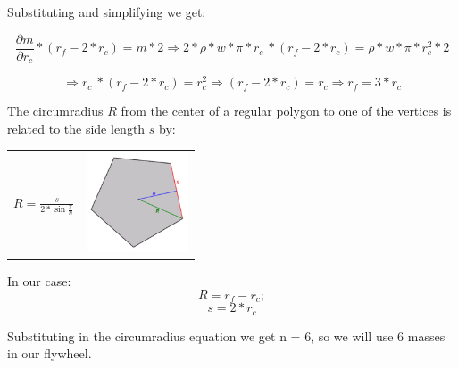 Substituting and simplifying we get:

\[\frac{\partial m}{\partial r_c} * (r_f - 2 * r_c) =  m * 2 \Rightarrow 2 * \rho * w * \pi *  r_c\ * (r_f - 2 * r_c) = \rho * w * \pi * r_c^2 * 2 \]

\[ \Rightarrow r_c\ * (r_f - 2 * r_c) =  r_c^2 \Rightarrow (r_f - 2 * r_c) =  r_c \Rightarrow r_f = 3 * r_c\]


The circumradius $R$ from the center of a regular polygon to one of the vertices is related to the side length $s$ by:

\begin{center}
	\begin{tabular}{ c  c }
		\(\displaystyle R=\frac {s}{2* \sin{\frac {\pi} {n}}} \)
		& 
		\includegraphics[width=3cm]{img/PolygonParameters.png}
	\end{tabular}
\end{center}

In our case:
\[ R = r_f - r_c; \]
\[ s = 2 * r_c\]

Substituting in the circumradius equation we get n = 6, so we will use 6 masses in our flywheel.